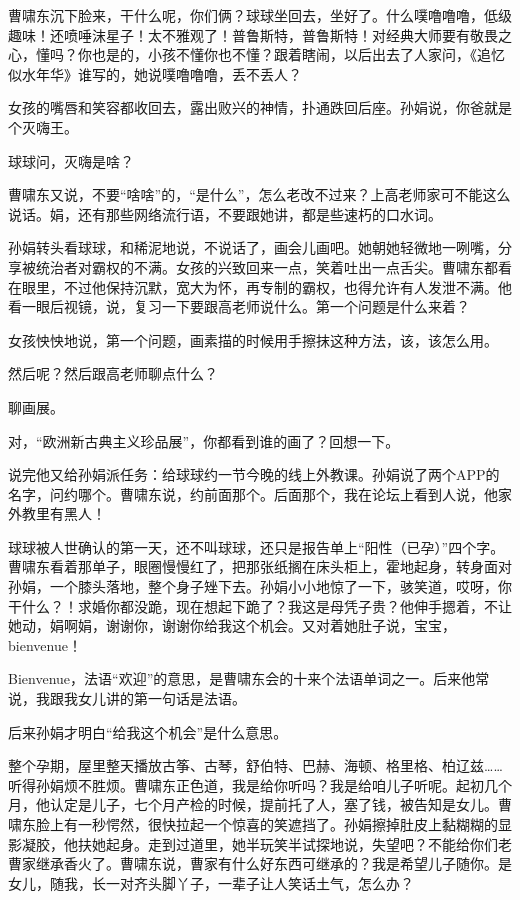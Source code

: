 \documentclass[lang=cn,newtx,12pt,scheme=chinese]{elegantbook}
\begin{document}
曹啸东沉下脸来，干什么呢，你们俩？球球坐回去，坐好了。什么噗噜噜噜，低级趣味！还喷唾沫星子！太不雅观了！普鲁斯特，普鲁斯特！对经典大师要有敬畏之心，懂吗？你也是的，小孩不懂你也不懂？跟着瞎闹，以后出去了人家问，《追忆似水年华》谁写的，她说噗噜噜噜，丢不丢人？

女孩的嘴唇和笑容都收回去，露出败兴的神情，扑通跌回后座。孙娟说，你爸就是个灭嗨王。

球球问，灭嗨是啥？

曹啸东又说，不要“啥啥”的，“是什么”，怎么老改不过来？上高老师家可不能这么说话。娟，还有那些网络流行语，不要跟她讲，都是些速朽的口水词。

孙娟转头看球球，和稀泥地说，不说话了，画会儿画吧。她朝她轻微地一咧嘴，分享被统治者对霸权的不满。女孩的兴致回来一点，笑着吐出一点舌尖。曹啸东都看在眼里，不过他保持沉默，宽大为怀，再专制的霸权，也得允许有人发泄不满。他看一眼后视镜，说，复习一下要跟高老师说什么。第一个问题是什么来着？

女孩怏怏地说，第一个问题，画素描的时候用手擦抹这种方法，该，该怎么用。

然后呢？然后跟高老师聊点什么？

聊画展。

对，“欧洲新古典主义珍品展”，你都看到谁的画了？回想一下。

说完他又给孙娟派任务：给球球约一节今晚的线上外教课。孙娟说了两个APP的名字，问约哪个。曹啸东说，约前面那个。后面那个，我在论坛上看到人说，他家外教里有黑人！

球球被人世确认的第一天，还不叫球球，还只是报告单上“阳性（已孕）”四个字。曹啸东看着那单子，眼圈慢慢红了，把那张纸搁在床头柜上，霍地起身，转身面对孙娟，一个膝头落地，整个身子矬下去。孙娟小小地惊了一下，骇笑道，哎呀，你干什么？！求婚你都没跪，现在想起下跪了？我这是母凭子贵？他伸手摁着，不让她动，娟啊娟，谢谢你，谢谢你给我这个机会。又对着她肚子说，宝宝，bienvenue！

Bienvenue，法语“欢迎”的意思，是曹啸东会的十来个法语单词之一。后来他常说，我跟我女儿讲的第一句话是法语。

后来孙娟才明白“给我这个机会”是什么意思。

整个孕期，屋里整天播放古筝、古琴，舒伯特、巴赫、海顿、格里格、柏辽兹……听得孙娟烦不胜烦。曹啸东正色道，我是给你听吗？我是给咱儿子听呢。起初几个月，他认定是儿子，七个月产检的时候，提前托了人，塞了钱，被告知是女儿。曹啸东脸上有一秒愕然，很快拉起一个惊喜的笑遮挡了。孙娟擦掉肚皮上黏糊糊的显影凝胶，他扶她起身。走到过道里，她半玩笑半试探地说，失望吧？不能给你们老曹家继承香火了。曹啸东说，曹家有什么好东西可继承的？我是希望儿子随你。是女儿，随我，长一对齐头脚丫子，一辈子让人笑话土气，怎么办？
\end{document}
